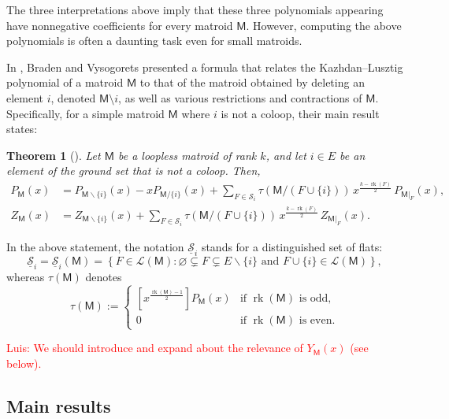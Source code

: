 \documentclass[11pt, a4paper, english]{amsart}
\theoremstyle{teoremas}
\newtheorem{theorem}{Theorem}[section]
\theoremstyle{definition}
\DeclareMathOperator{\rk}{rk}
\newcommand{\M}{\mathsf{M}}
\begin{document}
The three interpretations above imply that these three polynomials appearing have nonnegative coefficients for every matroid $\M$. However, computing the above polynomials is often a daunting task even for small matroids.

In \cite{braden-vysogorets}, Braden and Vysogorets presented a formula that relates the Kazhdan--Lusztig polynomial
of a matroid $\M$ to that of the matroid obtained by deleting an element $i$, denoted $\M\setminus i$, as well as various restrictions and contractions of $\M$. Specifically, for a simple matroid $\M$ where $i$ is not a coloop, their main result states:

\begin{theorem}[{\cite[Theorem~2.8]{braden-vysogorets}}]
    Let $\M$ be a loopless matroid of rank $k$, and let $i\in E$ be an element of the ground set that is not a coloop. Then,
    \begin{align*}
        P_{\M}(x) & = P_{\M\smallsetminus\{i\}}(x) - xP_{\M/\{i\}}(x) + \sum_{F\in\mathscr{S}_i} \tau\left(\M/{(F\cup\{i\})}\right)\, x^{\frac{k - \rk(F)}{2}}\, P_{\M|_F}(x), \\
        Z_{\M}(x) & = Z_{\M\smallsetminus\{i\}}(x) + \sum_{F\in\mathscr{S}_i} \tau\left(\M/{(F\cup\{i\})}\right)\, x^{\frac{k - \rk(F)}{2}}\, Z_{\M|_F}(x).
    \end{align*}
\end{theorem}

In the above statement, the notation $\underline{\mathscr{S}}_i$ stands for a distinguished set of flats:
\begin{equation}\label{eq:S_i}
    \underline{\mathscr{S}}_i = \underline{\mathscr{S}}_i(\M) = \left\{ F \in \mathcal{L}(\M): \varnothing \subsetneq F\subsetneq E\smallsetminus\{i\} \text{ and } F\cup\{i\}\in \mathcal{L}(\M)\right\},
\end{equation}
whereas $\tau(\M)$ denotes
\[ \tau(\M) :=
    \begin{cases}
        [x^{\frac{\rk(\M)-1}{2}}] P_{\M}(x) & \text{if $\rk(\M)$ is odd,}  \\
        0                                   & \text{if $\rk(\M)$ is even.}
    \end{cases}
\]

\textcolor{red}{Luis: We should introduce and expand about the relevance of $Y_{\M}(x)$ (see below). }



\subsection{Main results}
\end{document}
